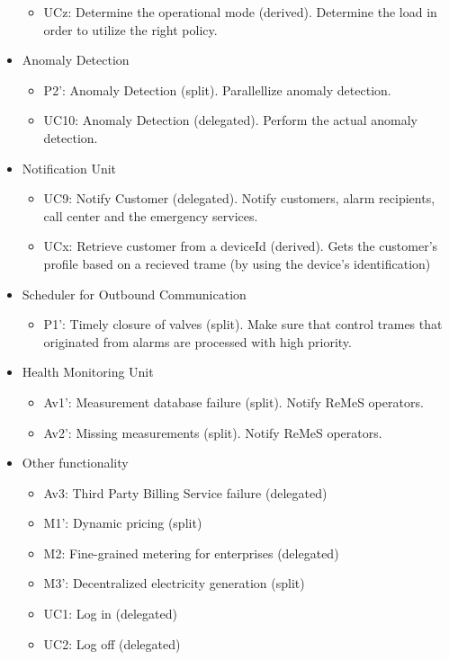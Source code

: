 \begin{itemize}
\begin{itemize}
		\item UCz: Determine the operational mode (derived). Determine the load in
		order to utilize the right policy.
	\end{itemize}
	\item Anomaly Detection
	\begin{itemize}
		\item P2': Anomaly Detection (split). Parallellize anomaly detection.
		\item UC10: Anomaly Detection (delegated). Perform the actual anomaly
		detection.
	\end{itemize}
	\item Notification Unit
	\begin{itemize}
		\item UC9: Notify Customer (delegated). Notify customers, alarm recipients,
		call center and the emergency services. 
	  	\item UCx: Retrieve customer from a deviceId (derived). Gets the customer's
	  	profile based on a recieved trame (by using the device's identification)
	\end{itemize}
	\item Scheduler for Outbound Communication
	\begin{itemize}
	  \item P1': Timely closure of valves (split). Make sure that control trames
	  that originated from alarms are processed with high priority. 
	\end{itemize}
	\item Health Monitoring Unit
	\begin{itemize}
		\item Av1': Measurement database failure (split). Notify ReMeS operators. 
		\item Av2': Missing measurements (split). Notify ReMeS operators.
	\end{itemize}
	\item Other functionality
	\begin{itemize}
	  	\item Av3: Third Party Billing Service failure (delegated)
	  	\item M1': Dynamic pricing (split)
	  	\item M2: Fine-grained metering for enterprises (delegated)
	  	\item M3': Decentralized electricity generation (split)
	  	\item UC1: Log in (delegated)
	  	\item UC2: Log off (delegated)

\end{itemize}
\end{itemize}
